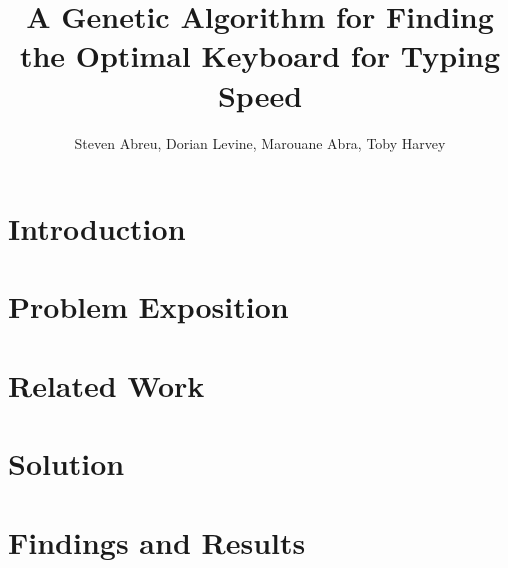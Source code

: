 \documentclass{acmtog} %
\begin{document}
\title{A Genetic Algorithm for Finding the Optimal Keyboard for Typing Speed} %

\author{
Steven Abreu, Dorian Levine, Marouane Abra, Toby Harvey
}


\maketitle


\section{Introduction}


\section{Problem Exposition}


\section{Related Work}

\section{Solution}

\section{Findings and Results}



\begin{thebibliography}{2}

\end{thebibliography}
\end{document}

